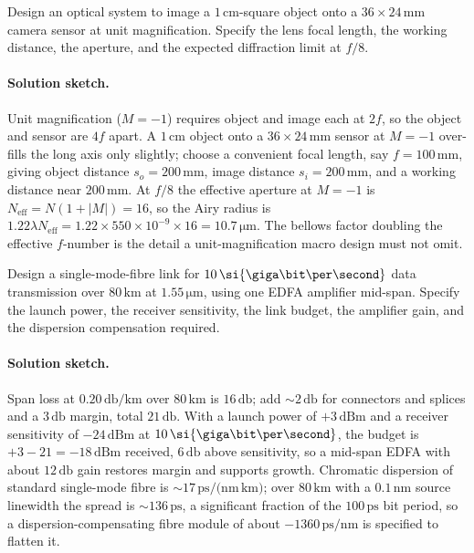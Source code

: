 \begin{exercise}
Design an optical system to image a $1\,\si{\centi\meter}$-square
object onto a $36\times 24\,\si{\milli\meter}$ camera sensor at unit
magnification. Specify the lens focal length, the working distance,
the aperture, and the expected diffraction limit at $f/8$.
\paragraph{Solution sketch.} Unit magnification ($M = -1$) requires
object and image each at $2f$, so the object and sensor are $4f$ apart.
A $1\,\si{\centi\meter}$ object onto a $36\times24\,\si{\milli\meter}$
sensor at $M = -1$ over-fills the long axis only slightly; choose a
convenient focal length, say $f = 100\,\si{\milli\meter}$, giving object
distance $s_{o} = 200\,\si{\milli\meter}$, image distance
$s_{i} = 200\,\si{\milli\meter}$, and a working distance near
$200\,\si{\milli\meter}$. At $f/8$ the effective aperture at $M = -1$ is
$N_{\text{eff}} = N(1+|M|) = 16$, so the Airy radius is
$1.22\lambda N_{\text{eff}} = 1.22\times 550\times10^{-9}\times 16 =
10.7\,\si{\micro\meter}$. The bellows factor doubling the effective
$f$-number is the detail a unit-magnification macro design must not
omit.
\end{exercise}

\begin{exercise}
Design a single-mode-fibre link for $10\,\si{\giga\bit\per\second}$
data transmission over $80\,\si{\kilo\meter}$ at $1.55\,\si{\micro
\meter}$, using one EDFA amplifier mid-span. Specify the launch
power, the receiver sensitivity, the link budget, the amplifier gain,
and the dispersion compensation required.
\paragraph{Solution sketch.} Span loss at
$0.20\,\si{\decibel\per\kilo\meter}$ over $80\,\si{\kilo\meter}$ is
$16\,\si{\decibel}$; add $\sim 2\,\si{\decibel}$ for connectors and
splices and a $3\,\si{\decibel}$ margin, total $21\,\si{\decibel}$. With
a launch power of $+3\,\text{dBm}$ and a receiver sensitivity of
$-24\,\text{dBm}$ at $10\,\si{\giga\bit\per\second}$, the budget is
$+3 - 21 = -18\,\text{dBm}$ received, $6\,\si{\decibel}$ above
sensitivity, so a mid-span EDFA with about $12\,\si{\decibel}$ gain
restores margin and supports growth. Chromatic dispersion of standard
single-mode fibre is $\sim 17\,\si{\pico\second/(\nano\meter\,\kilo
\meter)}$; over $80\,\si{\kilo\meter}$ with a $0.1\,\si{\nano\meter}$
source linewidth the spread is $\sim 136\,\si{\pico\second}$, a
significant fraction of the $100\,\si{\pico\second}$ bit period, so a
dispersion-compensating fibre module of about $-1360\,\si{\pico\second/
\nano\meter}$ is specified to flatten it.
\end{exercise}

